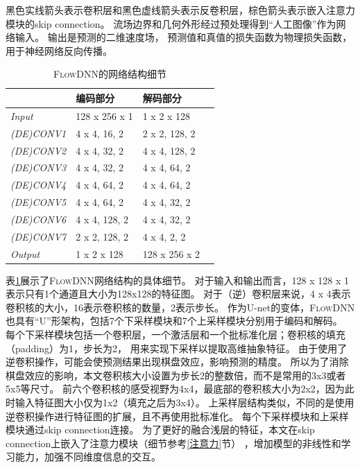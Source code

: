 \noindent 黑色实线箭头表示卷积层和黑色虚线箭头表示反卷积层，棕色箭头表示嵌入注意力模块的skip connection。
流场边界和几何外形经过预处理得到“人工图像”作为网络输入。 输出是预测的二维速度场，
预测值和真值的损失函数为物理损失函数，用于神经网络反向传播。


\begin{table}[htp]
	\caption{
		\textsc{FlowDNN}的网络结构细节}
	\centering
	\begin{tabular}{p{3cm}p{3cm}p{3cm}p{3cm}}
		\toprule[0.4mm]
		& \multicolumn{1}{l}{编码部分} & \multicolumn{1}{l}{解码部分} \\
		\midrule
		
		\textit{Input}   & 128 x 256 x 1	& 1 x 2 x 128    \\
		\midrule
		\textit{(DE)CONV1}   &	4 x 4, 16, 2	& 2 x 2, 128, 2      	\\
		\textit{(DE)CONV2}   &	4 x 4, 32, 2	& 4 x 4, 128, 2    	\\
		\textit{(DE)CONV3}   &	4 x 4, 32, 2	& 4 x 4, 64, 2      \\
		\textit{(DE)CONV4}   &	4 x 4, 64, 2	& 4 x 4, 64, 2      \\
		\textit{(DE)CONV5}   &	4 x 4, 64, 2	& 4 x 4, 32, 2      \\
		\textit{(DE)CONV6}   &	4 x 4, 128, 2	& 4 x 4, 32, 2      \\
		\textit{(DE)CONV7}   &	2 x 2, 128, 2	& 4 x 4, 2, 2      \\

		\midrule
		\textit{Output}   & 	1 x 2 x 128		& 128 x 256 x 2      \\
		\bottomrule[0.4mm]
	\end{tabular}
	\label{tab:flowdnn}
\end{table}

表\ref{tab:flowdnn}展示了\textsc{FlowDNN}网络结构的具体细节。
对于输入和输出而言，128 x 128 x 1表示只有1个通道且大小为128x128的特征图。
对于（逆）卷积层来说，4 x 4表示卷积核的大小，16表示卷积核的数量，2表示步长。
作为U-net的变体，\textsc{FlowDNN}也具有“U”形架构，包括7个下采样模块和7个上采样模块分别用于编码和解码。
每个下采样模块包括一个卷积层，一个激活层和一个批标准化层；卷积核的填充（padding）为1，步长为2，
用来实现下采样以提取高维抽象特征。
由于使用了逆卷积操作，可能会使预测结果出现棋盘效应\cite{odena2016deconvolution}，影响预测的精度。
所以为了消除棋盘效应的影响，本文卷积核大小设置为步长2的整数倍，而不是常用的3x3或者5x5等尺寸。
前六个卷积核的感受视野为4x4，最底部的卷积核大小为2x2，因为此时输入特征图大小仅为1x2（填充之后为3x4）。
上采样层结构类似，不同的是使用逆卷积操作进行特征图的扩展，且不再使用批标准化。
每个下采样模块和上采样模块通过skip connection连接。
为了更好的融合浅层的特征，本文在skip connection上嵌入了注意力模块（细节参考\ref{注意力}节）
，增加模型的非线性和学习能力，加强不同维度信息的交互。



